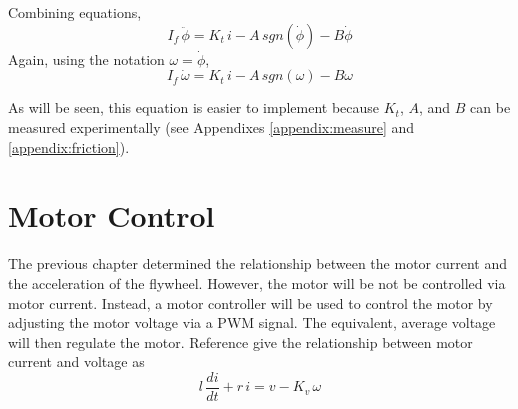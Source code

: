 \documentclass[12pt,letterpaper]{article}
\begin{document}

Combining equations,
%
\begin{equation}
    I_{f} \, \ddot{\phi}  = K_{t} \, i - A \, sgn(\dot{\phi} ) - B \dot{\phi}
\end{equation}
%
Again, using the notation $\omega = \dot{\phi}$,
%
\begin{equation}
    I_{f} \, \dot{\omega}  = K_{t} \, i - A \, sgn(\omega) - B \omega \label{wheel}
\end{equation}
%

As will be seen, this equation is easier to implement because $K_{t}$, $A$, and $B$ can be measured experimentally (see Appendixes \ref{appendix:measure} and \ref{appendix:friction}).  







\section{Motor Control}
The previous chapter determined the relationship between the motor current and the acceleration of the flywheel.  
However, the motor will be not be controlled via motor current.  Instead, a motor controller will be used to control the 
motor by adjusting the motor voltage via a PWM signal.  The equivalent, average voltage will then regulate the motor.  
Reference \cite{monograph} give the relationship between motor current and voltage as
%
\begin{equation}
    l \, \frac{di}{dt} + r \,i = v - K_{v} \, \omega
\end{equation}
%

\end{document}
